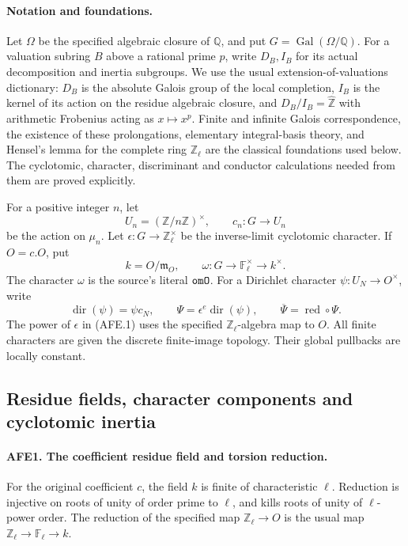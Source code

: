 \documentclass[11pt,a4paper]{article}
\numberwithin{equation}{section}
\theoremstyle{remark}\newtheorem{remark}[theorem]{Remark}
\begin{document}
\paragraph{Notation and foundations.}
Let \(\Omega\) be the specified algebraic closure of \(\mathbb Q\),
and put \(G=\operatorname{Gal}(\Omega/\mathbb Q)\).
For a valuation subring \(B\) above a rational prime \(p\), write
\(D_B,I_B\) for its actual decomposition and inertia subgroups.
We use the usual extension-of-valuations dictionary: \(D_B\)
is the absolute Galois group of the local completion, \(I_B\)
is the kernel of its action on the residue algebraic closure,
and \(D_B/I_B=\widehat{\mathbb Z}\) with arithmetic Frobenius
acting as \(x\mapsto x^p\).
Finite and infinite Galois correspondence, the existence of
these prolongations, elementary integral-basis theory, and
Hensel's lemma for the complete ring \(\mathbb Z_\ell\) are
the classical foundations used below.  The cyclotomic,
character, discriminant and conductor calculations needed
from them are proved explicitly.

For a positive integer \(n\), let
\[
 U_n=(\mathbb Z/n\mathbb Z)^\times,\qquad
 c_n:G\longrightarrow U_n
\]
be the action on \(\mu_n\).  Let
\(\epsilon:G\to\mathbb Z_\ell^\times\) be the inverse-limit
cyclotomic character.  If \(O=c.O\), put
\[
 k=O/\mathfrak m_O,\qquad
 \omega:G\longrightarrow\mathbb F_\ell^\times
                         \longrightarrow k^\times .
\]
The character \(\omega\) is the source's literal
\(\texttt{om\allowbreak O}\).  For a Dirichlet character
\(\psi:U_N\to O^\times\), write
\[
 \operatorname{dir}(\psi)=\psi c_N,\qquad
 \Psi=\epsilon^e\operatorname{dir}(\psi),\qquad
 \overline\Psi=\operatorname{red}\circ\Psi.
                                                        \tag{AFE.1}
\]
The power of \(\epsilon\) in (AFE.1) uses the specified
\(\mathbb Z_\ell\)-algebra map to \(O\).
All finite characters are given the discrete finite-image
topology.  Their global pullbacks are locally constant.

\subsection{Residue fields, character components and cyclotomic inertia}

\paragraph{AFE1. The coefficient residue field and torsion reduction.}
\label{claim:AFE1}
For the original coefficient \(c\), the field \(k\) is finite
of characteristic \(\ell\).  Reduction is injective on roots
of unity of order prime to \(\ell\), and kills roots of unity
of \(\ell\)-power order.  The reduction of the specified map
\(\mathbb Z_\ell\to O\) is the usual map
\(\mathbb Z_\ell\to\mathbb F_\ell\to k\).
\end{document}
